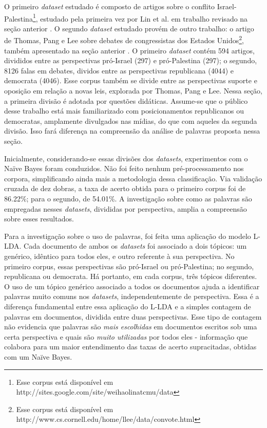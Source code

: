 O primeiro \emph{dataset} estudado é composto de artigos sobre o conflito Israel-Palestina\footnote{Esse corpus está disponível em http://sites.google.com/site/weihaolinatcmu/data}, estudado pela primeira vez por Lin et al. em trabalho revisado na seção anterior \cite{lin-et-al2006}. O segundo \emph{dataset} estudado provém de outro trabalho: o artigo de Thomas, Pang e Lee sobre debates de congressistas dos Estados Unidos\footnote{Esse corpus está disponível em http://www.cs.cornell.edu/home/llee/data/convote.html}, também apresentado na seção anterior \cite{get-out-the-vote}. O primeiro \emph{dataset} contém 594 artigos, divididos entre as perspectivas pró-Israel (297) e pró-Palestina (297); o segundo, 8126 falas em debates, dividos entre as perspectivas republicana (4044) e democrata (4046). Esse corpus também se divide entre as perspectivas suporte e oposição em relação a novas leis, explorada por Thomas, Pang e Lee. Nessa seção, a primeira divisão é adotada por questões didáticas. Assume-se que o público desse trabalho está mais familiarizado com posicionamentos republicanos ou democratas, amplamente divulgados nas mídias, do que com aqueles da segunda divisão. Isso fará diferença na compreensão da análise de palavras proposta nessa seção.

Inicialmente, considerando-se essas divisões dos \emph{datasets}, experimentos com o Naïve Bayes foram conduzidos. Não foi feito nenhum pré-processamento nos corpora, simplificando ainda mais a metodologia dessa classificação. Via validação cruzada de dez dobras, a taxa de acerto obtida para o primeiro corpus foi de 86.22\%; para o segundo, de 54.01\%. A investigação sobre como as palavras são empregadas nesses \emph{datasets}, divididas por perspectiva, amplia a compreensão sobre esses resultados.


Para a investigação sobre o uso de palavras, foi feita uma aplicação do modelo L-LDA. Cada documento de ambos os \emph{datasets} foi associado a dois tópicos: um genérico, idêntico para todos eles, e outro referente à sua perspectiva. No primeiro corpus, essas perspectivas são pró-Israel ou pró-Palestina; no segundo, republicana ou democrata. Há portanto, em cada corpus, três tópicos diferentes. O uso de um tópico genérico associado a todos os documentos ajuda a identificar palavras muito comuns nos \emph{datasets}, independentemente de perspectiva. Essa é a diferença fundamental entre essa aplicação do L-LDA e a simples contagem de palavras em documentos, dividida entre duas perspectivas. Esse tipo de contagem não evidencia que palavras são \emph{mais escolhidas} em documentos escritos sob uma certa perspectiva e quais são \emph{muito utilizadas} por todos eles - informação que colabora para um maior entendimento das taxas de acerto supracitadas, obtidas com um Naïve Bayes. 


